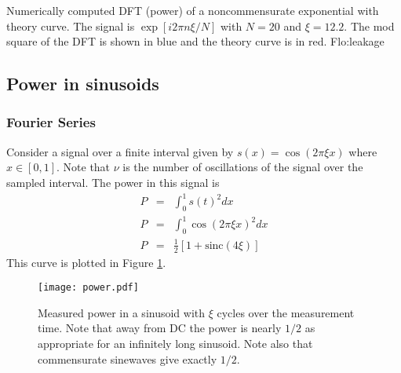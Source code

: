 {Numerically computed DFT (power) of a noncommensurate exponential
with theory curve. The signal is $\exp\left[i2\pi n\xi/N\right]$
with $N=20$ and $\xi=12.2$. The mod square of the DFT is shown in
blue and the theory curve is in red.}
{Flo:leakage}


\subsection{Power in sinusoids}

\subsubsection{Fourier Series}

Consider a signal over a finite interval given by $s(x)=\cos(2\pi\xi x)$
where $x\in[0,1]$. Note that $\nu$ is the number of oscillations
of the signal over the sampled interval. The power in this signal
is \begin{eqnarray*}
P & = & \int_{0}^{1}s(t)^{2}dx\\
P & = & \int_{0}^{1}\cos(2\pi\xi x)^{2}dx\\
P & = & \frac{1}{2}\left[1+\textrm{sinc}\left(4\xi\right)\right]\end{eqnarray*}
This curve is plotted in Figure \ref{Flo:PowerFromNoncommensurateSinusoid}.

%
\begin{figure}
\begin{centering}
\texttt{[image: power.pdf]}
\par\end{centering}

\caption{Measured power in a sinusoid with $\xi$ cycles over the measurement
time. Note that away from DC the power is nearly $1/2$ as appropriate
for an infinitely long sinusoid. Note also that commensurate sinewaves
give exactly $1/2$.}


\label{Flo:PowerFromNoncommensurateSinusoid}
\end{figure}


